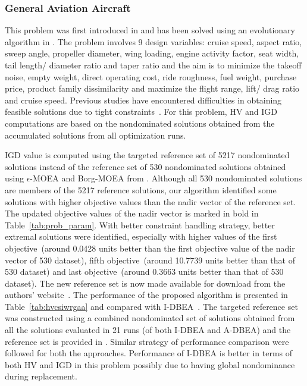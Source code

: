 \subsubsection{General Aviation Aircraft}

This problem was first introduced in \cite{Simpson1996} and has been solved using an evolutionary algorithm in \cite{Hadka2012many}. The problem involves 9 design variables: cruise speed, aspect ratio, sweep angle, propeller diameter, wing loading, engine activity factor, seat width, tail length/ diameter ratio and taper ratio and the aim is to minimize the takeoff noise, empty weight, direct operating cost, ride roughness, fuel weight, purchase price, product family dissimilarity and maximize the flight range, lift/ drag ratio and cruise speed. Previous studies have encountered difficulties in obtaining feasible solutions due to tight constraints~\cite{Simpson1996}. For this problem, HV and IGD computations are based on the nondominated solutions obtained from the accumulated solutions from all optimization runs.

IGD value is computed using the targeted reference set of 5217 nondominated solutions instead of the reference set of 530 nondominated solutions obtained using $\epsilon$-MOEA and Borg-MOEA from \cite{Hadka2012many}. Although all 530 nondominated solutions are members of the 5217 reference solutions, our algorithm identified some solutions with higher objective values than the nadir vector of the reference set\cite{Hadka2012many}. The updated objective values of the nadir vector is marked in bold in Table~\ref{tab:prob_param}. With better constraint handling strategy, better extremal solutions were identified, especially with higher values of the first objective~(around 0.0428 units better than the first objective value of the nadir vector of 530 dataset), fifth objective~(around 10.7739 units better than that of 530 dataset) and last objective~(around 0.3663 units better than that of 530 dataset). The new reference set is now made available for download from the authors' website~\cite{mdo2017adbea}. The performance of the proposed algorithm is presented in Table~\ref{tab:hvcsiwrgaa} and compared with I-DBEA~\cite{Asafmany2015}. The targeted reference set was constructed using a combined nondominated set of solutions obtained from all the solutions evaluated in 21 runs (of both I-DBEA and A-DBEA) and the reference set is provided in \cite{Hadka2012many}. Similar strategy of performance comparison were followed for both the approaches. Performance of I-DBEA is better in terms of both HV and IGD in this problem possibly due to having global nondominance during replacement. 

